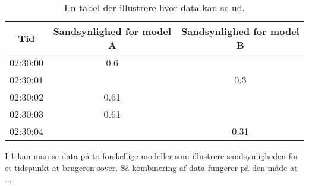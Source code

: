 \begin{table}
\begin{tabular}{|c|c|c|}
\hline Tid & Sandsynlighed for model A & Sandsynlighed for model B \\ 
\hline 02:30:00 & 	0.6    & ~ \\ 
\hline 02:30:01 & 	~ 	   & 0.3 \\ 
\hline 02:30:02 & 	0.61   & ~ \\ 
\hline 02:30:03 & 	0.61   & ~ \\ 
\hline 02:30:04 & 	~      & 0.31 \\ 
\hline 
\end{tabular} 
\caption{En tabel der illustrere hvor data kan se ud.}
\label{tab:combiModelsExample}
\end{table}

I \cref{tab:combiModelsExample} kan man se data på to forskellige modeller som illustrere sandsynligheden for et tidspunkt at brugeren sover.
Så kombinering af data fungerer på den måde at ...